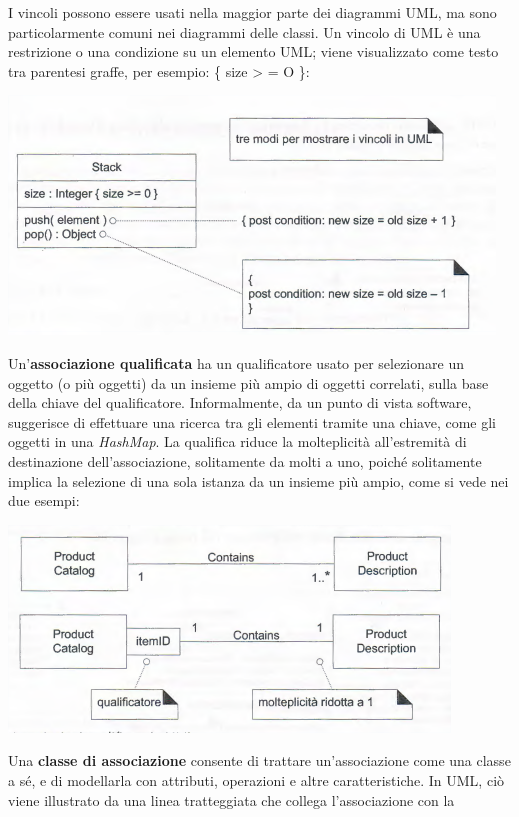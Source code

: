 \documentclass[a4paper,12pt, oneside]{book}
\begin{document}
I vincoli possono essere usati nella maggior parte dei diagrammi UML, ma sono particolarmente comuni nei diagrammi delle classi. Un vincolo di UML è una restrizione o una
condizione su un elemento UML; viene visualizzato come testo tra parentesi graffe, per esempio: \{ size > = O \}:
\begin{center}
	\includegraphics[scale=0.7]{img/clasd16.png}
\end{center}
Un'\textbf{associazione qualificata} ha un qualificatore usato per selezionare un oggetto (o più oggetti) da un insieme più ampio di oggetti correlati, sulla base della chiave del qualificatore. Informalmente, da un punto di vista software, suggerisce di effettuare una ricerca
tra gli elementi tramite una chiave, come gli oggetti in una \textit{HashMap}. La qualifica riduce la molteplicità all'estremità di destinazione dell'associazione, solitamente
da molti a uno, poiché solitamente implica la selezione di una sola istanza da un insieme più ampio, come si vede nei due esempi:
\begin{center}
	\includegraphics[scale=0.7]{img/clasd17.png}
\end{center}
Una \textbf{classe di associazione} consente di trattare un'associazione come una classe a sé, e di
modellarla con attributi, operazioni e altre caratteristiche. In UML, ciò viene illustrato da una linea tratteggiata che collega l'associazione con la
\end{document}
